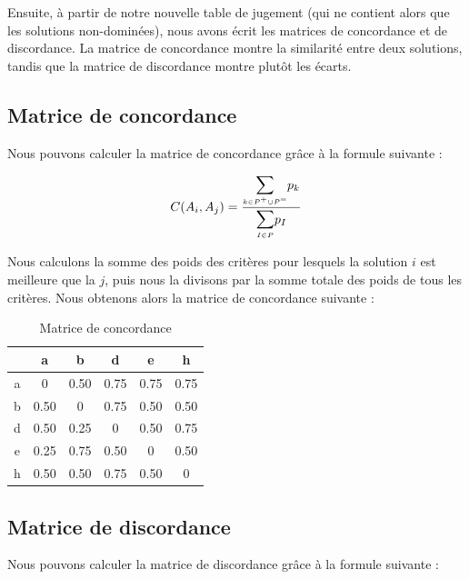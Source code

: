 \documentclass[paper=a4, fontsize=11pt]{report}
\numberwithin{equation}{section}		%
\numberwithin{figure}{section}			%
\numberwithin{table}{section}				%
\begin{document}
Ensuite, à partir de notre nouvelle table de jugement (qui ne contient alors que les solutions non-dominées), nous avons écrit les matrices de concordance et de discordance. La matrice de concordance montre la similarité entre deux solutions, tandis que la matrice de discordance montre plutôt les écarts.\\

\subsection{Matrice de concordance}

Nous pouvons calculer la matrice de concordance grâce à la formule suivante :

\begin{equation*}
C(A_i, A_j) = \frac{\mathlarger{\mathlarger{\sum}}\limits_{\mathsmaller{k \in P^+ \cup P^=}} p_k}{\mathlarger{\mathlarger{\sum}}\limits_{\mathsmaller{I \in P}} p_I}
\end{equation*} 

Nous calculons la somme des poids des critères pour lesquels la solution $i$ est meilleure que la $j$, puis nous la divisons par la somme totale des poids de tous les critères. Nous obtenons alors la matrice de concordance suivante : \\

\begin{table}[H]
\begin{center}
\begin{tabular}{c|ccccc}
 & a & b & d & e & h \\ 
\hline 
a & 0 & 0.50 & 0.75 & 0.75 & 0.75 \\ 
b & 0.50 & 0 &	0.75 &	 0.50 & 0.50 \\ 
d & 0.50 & 0.25 & 0 & 0.50 & 0.75 \\ 
e & 0.25 & 0.75 & 0.50 & 0 & 0.50 \\ 
h & 0.50 & 0.50 & 0.75 & 0.50 & 0\\ 
\end{tabular} 
\caption{Matrice de concordance} 
\end{center}
\end{table}

\subsection{Matrice de discordance} 

Nous pouvons calculer la matrice de discordance grâce à la formule suivante :
\end{document}
